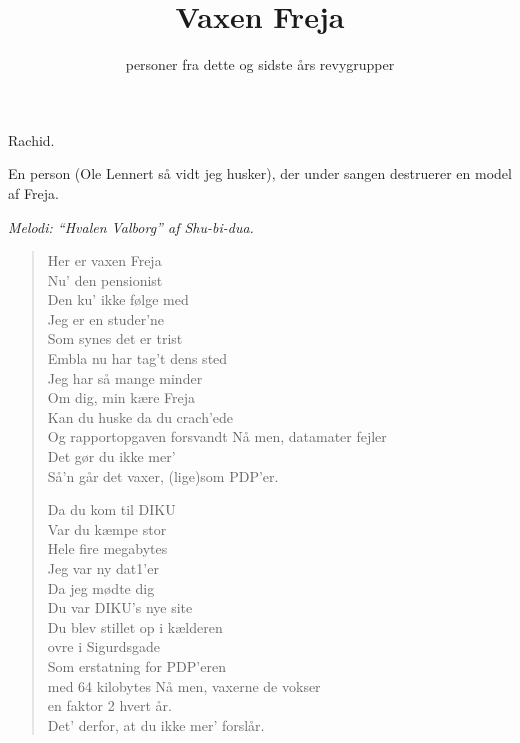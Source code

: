 \documentclass[a4paper,11pt]{article}
\title{Vaxen Freja}
\author{personer fra dette og sidste års revygrupper}
\begin{document}
\maketitle

\begin{roles}

   Rachid.

 En person (Ole Lennert så vidt jeg husker), der under sangen
                destruerer en model af Freja.

\end{roles}

\begin{sketch}

\centerline{\em Melodi: ``Hvalen Valborg'' af Shu-bi-dua.}

\begin{verse}

Her er vaxen Freja\\
Nu' den pensionist\\
Den ku' ikke følge med\\
Jeg er en studer'ne\\
Som synes det er trist\\
Embla nu har tag't dens sted\\
Jeg har så mange minder\\
Om dig, min kære Freja\\
Kan du huske da du crach'ede\\
Og rapportopgaven forsvandt
\vskip 8mm
Nå men, datamater fejler\\
Det gør du ikke mer'\\
Så'n går det vaxer, (lige)som PDP'er.

\vskip 8mm
Da du kom til DIKU\\
Var du kæmpe stor\\
Hele fire megabytes\\
Jeg var ny dat1'er\\
Da jeg mødte dig\\
Du var DIKU's nye site\\
Du blev stillet op i kælderen\\
ovre i Sigurdsgade\\
Som erstatning for PDP'eren\\
med 64 kilobytes
\vskip 8mm
Nå men, vaxerne de vokser\\
en faktor 2 hvert år.\\
Det' derfor, at du ikke mer' forslår.


\end{verse}
\end{sketch}
\end{document}
